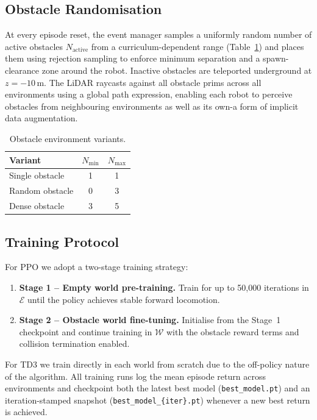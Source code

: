 \documentclass{article}
\begin{document}
\subsection{Obstacle Randomisation}

At every episode reset, the event manager samples a uniformly random number of
active obstacles $N_\text{active}$ from a curriculum-dependent range
(Table~\ref{tab:curricula}) and places them using rejection sampling to
enforce minimum separation and a spawn-clearance zone around the robot.
Inactive obstacles are teleported underground at $z = -10$\,m.
The LiDAR raycasts against all obstacle prims across all environments using
a global path expression, enabling each robot to perceive obstacles from
neighbouring environments as well as its own-a form of implicit data
augmentation.

\begin{table}[h]
  \centering
  \caption{Obstacle environment variants.}
  \label{tab:curricula}
  \begin{tabular}{lcc}
    \toprule
    \textbf{Variant} & $N_\text{min}$ & $N_\text{max}$ \\
    \midrule
    Single obstacle & 1 & 1 \\
    Random obstacle & 0 & 3 \\
    Dense obstacle  & 3 & 5 \\
    \bottomrule
  \end{tabular}
\end{table}

\subsection{Training Protocol}

For PPO we adopt a two-stage training strategy:
\begin{enumerate}
  \item \textbf{Stage 1 – Empty world pre-training.} Train for up to 50{,}000
        iterations in $\mathcal{E}$ until the policy achieves stable
        forward locomotion.
  \item \textbf{Stage 2 – Obstacle world fine-tuning.} Initialise from the
        Stage~1 checkpoint and continue training in $\mathcal{W}$ with the
        obstacle reward terms and collision termination enabled.
\end{enumerate}
For TD3 we train directly in each world from scratch due to the off-policy
nature of the algorithm.
All training runs log the mean episode return across environments and
checkpoint both the latest best model (\texttt{best\_model.pt}) and an
iteration-stamped snapshot (\texttt{best\_model\_\{iter\}.pt}) whenever a
new best return is achieved.
\end{document}
